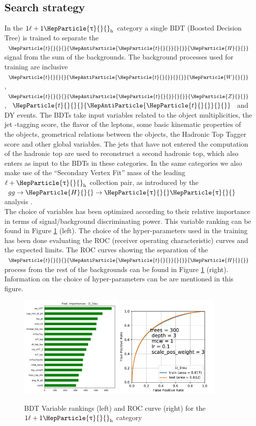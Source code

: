 \documentclass[12pt, a4paper]{article}
\DeclareRobustCommand{\PW}{{\HepParticle{W}{}{}}\xspace}
\DeclareRobustCommand{\PH}{{\HepParticle{H}{}{}}\xspace}
\DeclareRobustCommand{\PZ}{{\HepParticle{Z}{}{}}\xspace}
\DeclareRobustCommand{\PQb}{{\HepParticle{b}{}{}}\xspace} %
\DeclareRobustCommand{\PQt}{\HepParticle{t}{}{}} %
\DeclareRobustCommand{\PAQt}{{\HepAntiParticle{\PQt}{}{}}\xspace} %
\DeclareRobustCommand{\PGt}{{\HepParticle{\uptau}{}{}}\xspace} %
\newcommand{\ttbar}{\PQt{}\PAQt} %
\newcommand{\tauh}{\ensuremath{\PGt_\mathrm{h}}\xspace}
\newcommand{\ttH}{\ttbar\PH}
\begin{document}
\subsection{Search strategy}
In the $1\ell+1\tauh$ category a single BDT (Boosted Decision Tree) is trained to separate the $\ttH$ signal from the sum of the backgrounds. The background processes used for training are inclusive $\ttbar\PW$, $\ttbar\PZ$, $\ttbar$ and DY events. The BDTs take input variables related to the object multiplicities, the jet \PQb-tagging score, the flavor of the leptons, some basic kinematic properties of the objects, geometrical relations between the objects, the Hadronic Top Tagger score and other global variables. The jets that have not entered the computation of the hadronic top are used to reconstruct a second hadronic top, which also enters as input to the BDTs in these categories. In the same categories we also make use of the ``Secondary Vertex Fit'' mass of the leading $\ell+\tauh$   collection pair, as introduced by the $gg\to\PH\to\PGt\PGt$ analysis \cite{CMS:2014wdm}.\\
The choice of variables has been optimized according to their relative importance in terms of signal/background discriminating power. This variable ranking can be found in Figure \ref{var_rank} (left). The choice of the hyper-parameters used in the training has been done evaluating the ROC (receiver operating characteristic) curves and the expected limits. The ROC curves showing the separation of the $\ttH$ process from the rest of the backgrounds can be found in Figure \ref{var_rank} (right). Information on the choice of hyper-parameters can be are mentioned in this figure.
\begin{figure}[!htb]
	\includegraphics[width=0.45\textwidth]{Fig/var_rank.pdf}
	\includegraphics[width=0.45\textwidth]{Fig/roc.pdf}
	\caption{BDT Variable rankings (left) and ROC curve (right) for the $1\ell+1\tauh$ category}
	\label{var_rank}
\end{figure}
\end{document}
